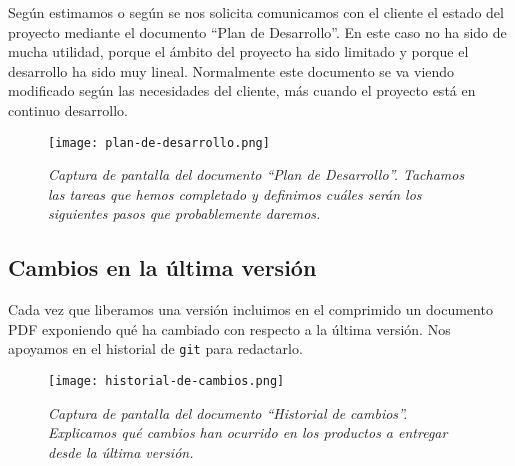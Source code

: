 Según estimamos o según se nos solicita comunicamos con el cliente el
estado del proyecto mediante el documento ``Plan de Desarrollo''.
En este caso no ha sido de mucha utilidad, porque el ámbito del proyecto
ha sido limitado y porque el desarrollo ha sido muy lineal. Normalmente
este documento se va viendo modificado según las necesidades del cliente,
más cuando el proyecto está en continuo desarrollo.

\begin{figure}[!h]
    \centering
    \texttt{[image: plan-de-desarrollo.png]}
    \caption{\textit{Captura de pantalla del documento ``Plan de Desarrollo''.
    Tachamos las tareas que hemos completado y definimos cuáles serán los
    siguientes pasos que probablemente daremos.}}
\end{figure}

\subsection{Cambios en la última versión}

Cada vez que liberamos una versión incluimos en el comprimido un documento
PDF exponiendo qué ha cambiado con respecto a la última versión. Nos
apoyamos en el historial de \texttt{git} para redactarlo.

\begin{figure}[!h]
    \centering
    \texttt{[image: historial-de-cambios.png]}
    \caption{\textit{Captura de pantalla del documento ``Historial de cambios''.
            Explicamos qué cambios han ocurrido en los productos a entregar
            desde la última versión.}}
\end{figure}
